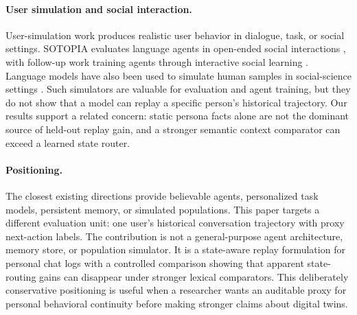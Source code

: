 \paragraph{User simulation and social interaction.}
User-simulation work produces realistic user behavior in dialogue, task, or social settings. SOTOPIA evaluates language agents in open-ended social interactions \cite{zhou2023sotopia}, with follow-up work training agents through interactive social learning \cite{wang2024sotopiapi}. Language models have also been used to simulate human samples in social-science settings \cite{argyle2023outofone}. Such simulators are valuable for evaluation and agent training, but they do not show that a model can replay a specific person's historical trajectory. Our results support a related concern: static persona facts alone are not the dominant source of held-out replay gain, and a stronger semantic context comparator can exceed a learned state router.

\paragraph{Positioning.}
The closest existing directions provide believable agents, personalized task models, persistent memory, or simulated populations. This paper targets a different evaluation unit: one user's historical conversation trajectory with proxy next-action labels. The contribution is not a general-purpose agent architecture, memory store, or population simulator. It is a state-aware replay formulation for personal chat logs with a controlled comparison showing that apparent state-routing gains can disappear under stronger lexical comparators. This deliberately conservative positioning is useful when a researcher wants an auditable proxy for personal behavioral continuity before making stronger claims about digital twins.
